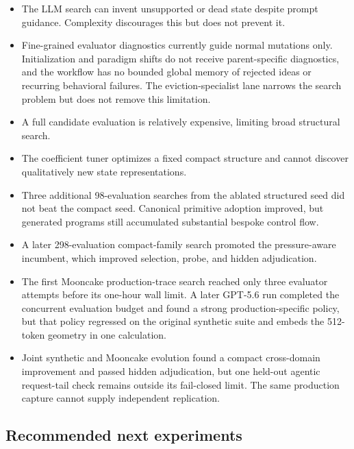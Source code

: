 \documentclass[11pt]{article}
\begin{document}
\begin{itemize}
  \item The LLM search can invent unsupported or dead state despite prompt guidance.
  Complexity discourages this but does not prevent it.
  \item Fine-grained evaluator diagnostics currently guide normal mutations only.
  Initialization and paradigm shifts do not receive parent-specific diagnostics, and
  the workflow has no bounded global memory of rejected ideas or recurring behavioral
  failures.  The eviction-specialist lane narrows the search problem but does not
  remove this limitation.
  \item A full candidate evaluation is relatively expensive, limiting broad structural
  search.
  \item The coefficient tuner optimizes a fixed compact structure and cannot discover
  qualitatively new state representations.
  \item Three additional 98-evaluation searches from the ablated structured seed did
  not beat the compact seed.  Canonical primitive adoption improved, but
  generated programs still accumulated substantial bespoke control flow.
  \item A later 298-evaluation compact-family search promoted the pressure-aware
  incumbent, which improved selection, probe, and hidden adjudication.
  \item The first Mooncake production-trace search reached only three evaluator
  attempts before its one-hour wall limit.  A later GPT-5.6 run completed the
  concurrent evaluation budget and found a strong production-specific policy, but
  that policy regressed on the original synthetic suite and embeds the 512-token
  geometry in one calculation.
  \item Joint synthetic and Mooncake evolution found a compact cross-domain
  improvement and passed hidden adjudication, but one held-out agentic request-tail
  check remains outside its fail-closed limit.  The same production capture cannot
  supply independent replication.
\end{itemize}

\subsection{Recommended next experiments}
\end{document}
